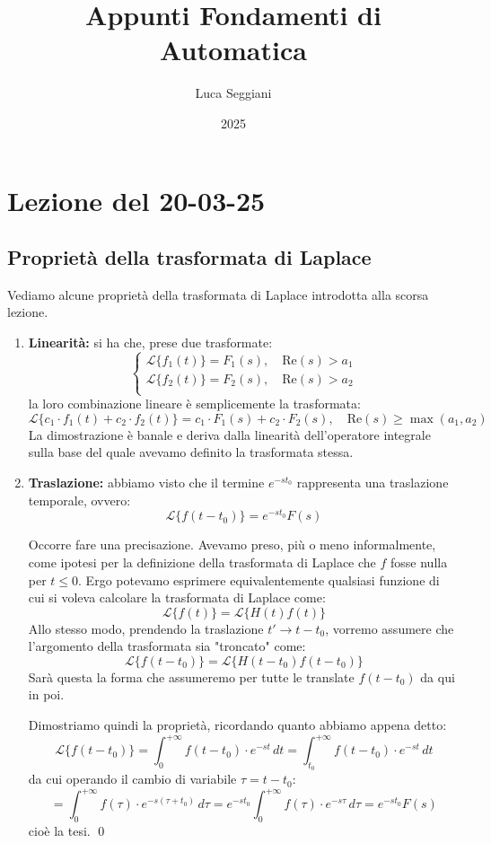 \documentclass[a4paper,11pt]{article}
\title{Appunti Fondamenti di Automatica}
\author{Luca Seggiani}
\date{2025}
\begin{document}
\section{Lezione del 20-03-25}
		
\thispagestyle{empty}
\pagestyle{fancy}

\subsection{Proprietà della trasformata di Laplace}
Vediamo alcune proprietà della trasformata di Laplace introdotta alla scorsa lezione.

\begin{enumerate}
	\item \textbf{Linearità:} si ha che, prese due trasformate:
		\[
			\begin{cases}
				\mathcal{L}\{f_1(t)\} = F_1(s), \quad \mathrm{Re}(s) > a_1 \\ 	
				\mathcal{L}\{f_2(t)\} = F_2(s), \quad \mathrm{Re}(s) > a_2 \\ 	
			\end{cases}
		\]
		la loro combinazione lineare è semplicemente la trasformata:
		$$
		\mathcal{L}\{c_1 \cdot f_1(t) + c_2 \cdot f_2(t)\} = c_1 \cdot F_1(s) + c_2 \cdot F_2(s), \quad \mathrm{Re}(s) \geq \max(a_1, a_2)
		$$
		La dimostrazione è banale e deriva dalla linearità dell'operatore integrale sulla base del quale avevamo definito la trasformata stessa.
	\item \textbf{Traslazione:} abbiamo visto che il termine $e^{-s t_0}$ rappresenta una traslazione temporale, ovvero:
		$$
		\mathcal{L}\{ f(t - t_0) \} = e^{-s t_0} F(s)
		$$

		Occorre fare una precisazione.
		Avevamo preso, più o meno informalmente, come ipotesi per la definizione della trasformata di Laplace che $f$ fosse nulla per $t \leq 0$.
		Ergo potevamo esprimere equivalentemente qualsiasi funzione di cui si voleva calcolare la trasformata di Laplace come:
		$$
		\mathcal{L}\{ f(t) \} = \mathcal{L}\{ H(t)f(t) \}
		$$
		Allo stesso modo, prendendo la traslazione $t' \rightarrow t - t_0$, vorremo assumere che l'argomento della trasformata sia "troncato" come:
		$$
		\mathcal{L}\{ f(t - t_0) \} = \mathcal{L}\{ H(t - t_0)f(t - t_0) \}
		$$
		Sarà questa la forma che assumeremo per tutte le translate $f(t - t_0)$ da qui in poi.


		Dimostriamo quindi la proprietà, ricordando quanto abbiamo appena detto:
		$$
		\mathcal{L}\{f(t - t_0)\} = \int_0^{+\infty} f(t - t_0) \cdot e^{-s t} \, dt = \int_{t_0}^{+\infty} f(t - t_0) \cdot e^{-s t} \, dt 
		$$
		da cui operando il cambio di variabile $\tau = t - t_0$: 
		$$
		= \int_0^{+\infty} f(\tau) \cdot e^{-s(\tau + t_0)} \, d\tau 
		= e^{-s t_0} \int_0^{+ \infty} f(\tau) \cdot e^{-s \tau} \, d\tau 
		= e^{-s t_0} F(s)
		$$ 
		cioè la tesi. \qed


\end{enumerate}
\end{document}
